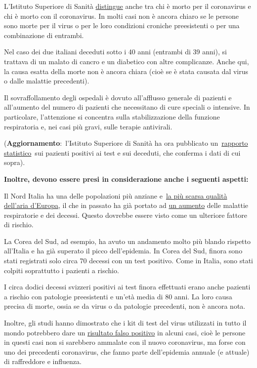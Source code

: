 L'Istituto Superiore di Sanità
\href{https://youtu.be/0M4kbPDHGR0?t=210}{distingue} anche tra chi è
morto per il coronavirus e chi è morto con il coronavirus. In molti casi
non è ancora chiaro se le persone sono morte per il virus o per le loro
condizioni croniche preesistenti o per una combinazione di entrambi.

Nel caso dei due italiani deceduti sotto i 40 anni (entrambi di 39
anni), si trattava di un malato di cancro e un diabetico con altre
complicanze. Anche qui, la causa esatta della morte non è ancora chiara
(cioè se è stata causata dal virus o dalle malattie precedenti).

Il sovraffollamento degli ospedali è dovuto all'afflusso generale di
pazienti e all'aumento del numero di pazienti che necessitano di cure
speciali o intensive. In particolare, l'attenzione si concentra sulla
stabilizzazione della funzione respiratoria e, nei casi più gravi, sulle
terapie antivirali.

(\textbf{Aggiornamento}:~l'Istituto Superiore di Sanità ha ora
pubblicato
un~\href{https://www.epicentro.iss.it/coronavirus/bollettino/Report-COVID-2019_17_marzo-v2.pdf}{rapporto
statistico}~sui pazienti positivi ai test e sui deceduti, che conferma i
dati di cui sopra).

\textbf{Inoltre, devono essere presi in considerazione anche i seguenti
aspetti:}

Il Nord Italia ha una delle popolazioni più anziane
e~\href{https://twitter.com/esa/status/1238480433047916545}{la più
scarsa qualità dell'aria d'Europa}, il che in passato ha già portato ad
\href{https://www.thelocal.it/20170131/our-lungs-are-breaking-smog-levels-way-above-safe-limits-in-northern-italy}{un
aumento} delle malattie respiratorie e dei decessi. Questo dovrebbe
essere visto come un ulteriore fattore di rischio.

 La Corea del Sud, ad esempio, ha avuto un andamento molto più blando
rispetto all'Italia e ha già superato il picco dell'epidemia. In Corea
del Sud, finora sono stati registrati solo circa 70 decessi con un test
positivo. Come in Italia, sono stati colpiti soprattutto i pazienti a
rischio.

I circa dodici decessi svizzeri positivi ai test finora effettuati erano
anche pazienti a rischio con patologie preesistenti e un'età media di 80
anni. La loro causa precisa di morte, ossia se da virus o da patologie
precedenti, non è ancora nota.

Inoltre, gli studi hanno dimostrato che i kit di test del virus
utilizzati in tutto il mondo potrebbero dare un
\href{https://www.ncbi.nlm.nih.gov/pmc/articles/PMC2095096/}{risultato
falso positivo} in alcuni casi, cioè le persone in questi casi non si
sarebbero ammalate con il nuovo coronavirus, ma forse con uno dei
precedenti coronavirus, che fanno parte dell'epidemia annuale (e
attuale) di raffreddore e influenza.\\

